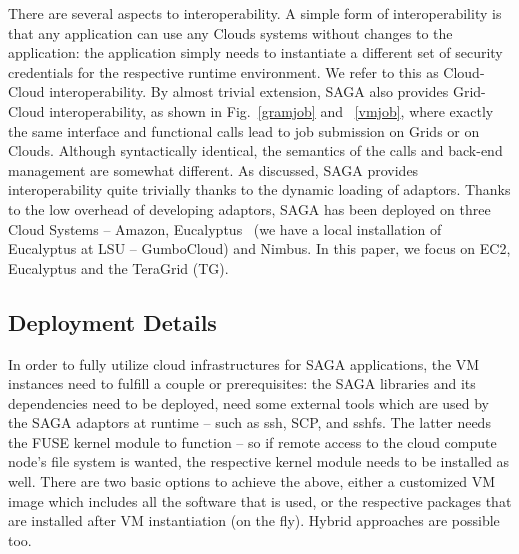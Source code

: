 \documentclass[conference,final]{IEEEtran}
\newcommand{\jhanote}[1]{ {\textcolor{red} { ***SJ: #1 }}}
\newcommand{\jhanote}[1]{}
\newcommand{\upup}{\vspace*{-0.6em}}
\begin{document}


There are several aspects to interoperability. A simple form of
interoperability is that any application can use any Clouds systems
without changes to the application: the application simply needs to
instantiate a different set of security credentials for the respective
runtime environment. We refer to this as Cloud-Cloud
interoperability. By almost trivial extension, SAGA also provides
Grid-Cloud interoperability, as shown in Fig.~\ref{gramjob} and
~\ref{vmjob}, where exactly the same interface and functional calls
lead to job submission on Grids or on Clouds. Although syntactically
identical, the semantics of the calls and back-end management are
somewhat different.  As discussed, SAGA provides interoperability
quite trivially thanks to the dynamic loading of adaptors.  Thanks to
the low overhead of developing adaptors, SAGA has been deployed on
three Cloud Systems -- Amazon, Eucalyptus~\cite{eucalyptus} (we have a
local installation of Eucalyptus at LSU -- GumboCloud) and
Nimbus.  In this paper, we focus on EC2, Eucalyptus and the TeraGrid
(TG).

\upup
\subsection{Deployment Details}

In order to fully utilize cloud infrastructures for SAGA applications,
the VM instances need to fulfill a couple or prerequisites: the SAGA
libraries and its dependencies need to be deployed, need some external
tools which are used by the SAGA adaptors at runtime -- such as ssh,
SCP, and sshfs.  The latter needs the FUSE kernel module to function
-- so if remote access to the cloud compute node's file system is
wanted, the respective kernel module needs to be installed as well.
There are two basic options to achieve the above, either a customized
VM image which includes all the software that is used, or the
respective packages that are installed after VM instantiation (on the
fly).  Hybrid approaches are possible too.
\end{document}
